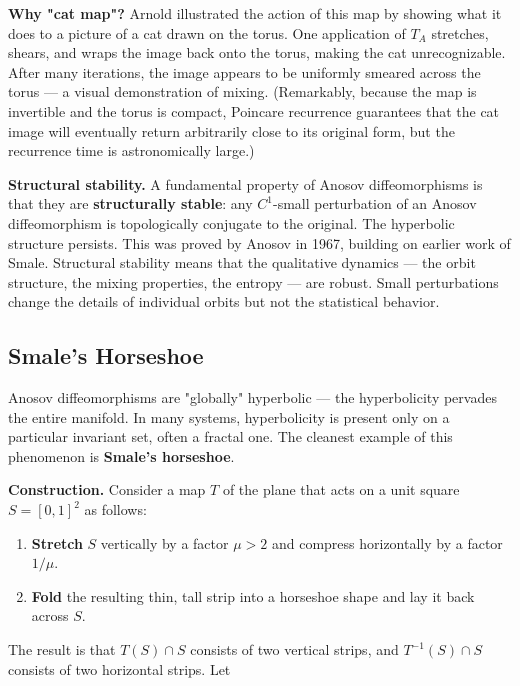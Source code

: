 \begin{example}
\textbf{Why "cat map"?} Arnold illustrated the action of this map by showing what it does to a picture of a cat drawn on the torus. One application of $T_A$ stretches, shears, and wraps the image back onto the torus, making the cat unrecognizable. After many iterations, the image appears to be uniformly smeared across the torus --- a visual demonstration of mixing. (Remarkably, because the map is invertible and the torus is compact, Poincare recurrence guarantees that the cat image will eventually return arbitrarily close to its original form, but the recurrence time is astronomically large.)

\textbf{Structural stability.} A fundamental property of Anosov diffeomorphisms is that they are \textbf{structurally stable}: any $C^1$-small perturbation of an Anosov diffeomorphism is topologically conjugate to the original. The hyperbolic structure persists. This was proved by Anosov in 1967, building on earlier work of Smale. Structural stability means that the qualitative dynamics --- the orbit structure, the mixing properties, the entropy --- are robust. Small perturbations change the details of individual orbits but not the statistical behavior.
\end{example}


\subsection{Smale's Horseshoe}\label{sec:12.1.3}

Anosov diffeomorphisms are "globally" hyperbolic --- the hyperbolicity pervades the entire manifold. In many systems, hyperbolicity is present only on a particular invariant set, often a fractal one. The cleanest example of this phenomenon is \textbf{Smale's horseshoe}.

\textbf{Construction.} Consider a map $T$ of the plane that acts on a unit square $S = [0,1]^2$ as follows:

\begin{enumerate}[nosep]
  \item \textbf{Stretch} $S$ vertically by a factor $\mu > 2$ and compress horizontally by a factor $1/\mu$.
  \item \textbf{Fold} the resulting thin, tall strip into a horseshoe shape and lay it back across $S$.
\end{enumerate}

The result is that $T(S) \cap S$ consists of two vertical strips, and $T^{-1}(S) \cap S$ consists of two horizontal strips. Let

